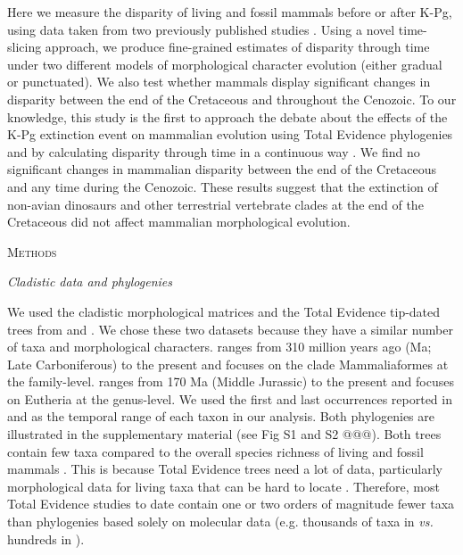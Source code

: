 \documentclass[12pt,letterpaper]{article}
\renewcommand{\section}[1]{%
\bigskip
\begin{center}
\begin{Large}
\normalfont\scshape #1
\medskip
\end{Large}
\end{center}}
\renewcommand{\subsection}[1]{%
\bigskip
\begin{center}
\begin{large}
\normalfont\itshape #1
\end{large}
\end{center}}
\begin{document}
Here we measure the disparity of living and fossil mammals before or after K-Pg, using data taken from two previously published studies \citep{Slater2012MEE,beckancient2014}. 
Using a novel time-slicing approach, we produce fine-grained estimates of disparity through time under two different models of morphological character evolution (either gradual or punctuated). 
We also test whether mammals display significant changes in disparity between the end of the Cretaceous and throughout the Cenozoic.
To our knowledge, this study is the first to approach the debate about the effects of the K-Pg extinction event on mammalian evolution using Total Evidence phylogenies and by calculating disparity through time in a continuous way \citep[but see][for a similar question]{halliday2013testing}.
We find no significant changes in mammalian disparity between the end of the Cretaceous and any time during the Cenozoic.
These results suggest that the extinction of non-avian dinosaurs and other terrestrial vertebrate clades at the end of the Cretaceous did not affect mammalian morphological evolution.

%
%

\section{Methods}

\subsection{Cladistic data and phylogenies}
We used the cladistic morphological matrices and the Total Evidence tip-dated trees \citep{ronquista2012} from \citet[][103 taxa with 446 morphological characters]{Slater2012MEE} and \citet[][102 taxa with 421 morphological characters]{beckancient2014}.
We chose these two datasets because they have a similar number of taxa and morphological characters.
\cite{Slater2012MEE} ranges from 310 million years ago (Ma; Late Carboniferous) to the present and focuses on the clade Mammaliaformes at the family-level.
\cite{beckancient2014} ranges from 170 Ma (Middle Jurassic) to the present and focuses on Eutheria at the genus-level.
We used the first and last occurrences reported in \cite{Slater2012MEE} and \cite{beckancient2014} as the temporal range of each taxon in our analysis.
Both phylogenies are illustrated in the supplementary material (see Fig S1 and S2 @@@).
%
Both trees contain few taxa compared to the overall species richness of living and fossil mammals \citep{wilson2005mammal,archibald2011extinction}. %
This is because Total Evidence trees need a lot of data, particularly morphological data for living taxa that can be hard to locate \citep{MissingMammals}.
Therefore, most Total Evidence studies to date contain one or two orders of magnitude fewer taxa than phylogenies based solely on molecular data (e.g. thousands of taxa in \citealt{bininda2007delayed,meredithimpacts2011} \textit{vs.} hundreds in \citealt{ronquista2012,Slater2012MEE,Wood01032013,beckancient2014}).
\end{document}
